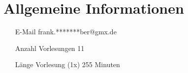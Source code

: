 
\chapter{Allgemeine Informationen}

\begin{itemize}
	\item [E-Mail] frank.*******ber@gmx.de
	\item[Anzahl Vorlesungen] 11
	\item[Länge Vorlesung (1x)] 255 Minuten
\end{itemize}